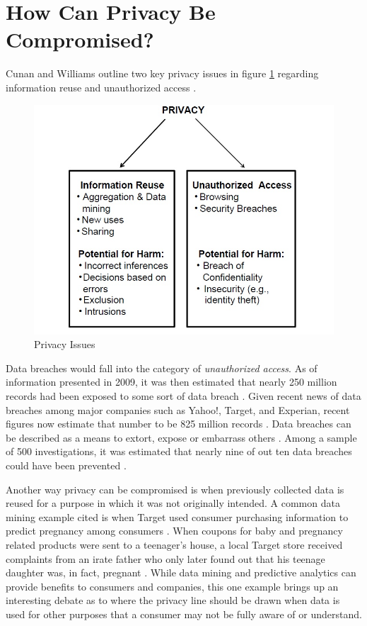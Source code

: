 \documentclass[sigconf]{acmart}
\begin{document}
\section{How Can Privacy Be Compromised?}
Cunan and Williams outline two key privacy issues in figure \ref{f:Privacy Issues} regarding information reuse and unauthorized access \cite{Culnan2009}. 
\begin{figure}[!ht]
  \centering\includegraphics[width=\columnwidth]{images/privacy.jpg}
  \caption{Privacy Issues}\label{f:Privacy Issues}
\end{figure}
Data breaches would fall into the category of \textit{unauthorized access}. As of information presented in 2009, it was then estimated that nearly 250 million records had been exposed to some sort of data breach \cite{Cavoukian2012}. Given recent news of data breaches among major companies such as Yahoo!, Target, and Experian, recent figures now estimate that number to be 825 million records \cite{Shell2017}. Data breaches can be described as a means to extort, expose or embarrass others \cite{Agelidis2016}. Among a sample of 500 investigations, it was estimated that nearly nine of out ten data breaches could have been prevented \cite{Culnan2009}. \par
Another way privacy can be compromised is when previously collected data is reused for a purpose in which it was not originally intended. A common data mining example cited is when Target used consumer purchasing information to predict pregnancy among consumers \cite{Xu2014}. When coupons for baby and pregnancy related products were sent to a teenager's house, a local Target store received complaints from an irate father who only later found out that his teenage daughter was, in fact, pregnant \cite{Xu2014}. While data mining and predictive analytics can provide benefits to consumers and companies, this one example brings up an interesting debate as to where the privacy line should be drawn when data is used for other purposes that a consumer may not be fully aware of or understand.
\end{document}
